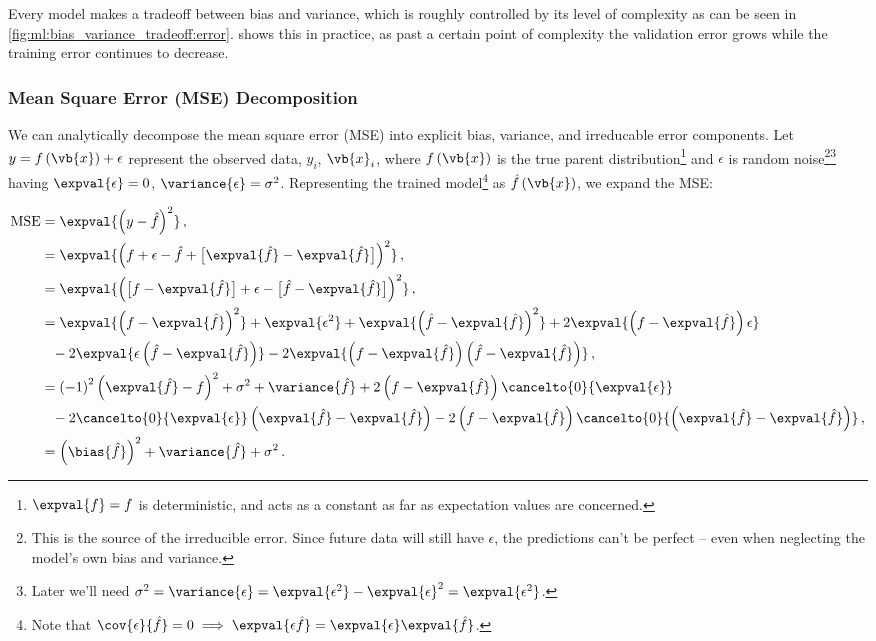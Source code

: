 Every model makes a tradeoff between bias and variance,
which is roughly controlled by its level of complexity
as can be seen in \cref{fig:ml:bias_variance_tradeoff:error}.
 shows this in practice,
as past a certain point of complexity the validation error grows
while the training error continues to decrease.

\subsubsection{Mean Square Error (MSE) Decomposition}
\label{ml_general:bias_variance_tradeoff:decop}

We can analytically decompose the mean square error (MSE) into explicit
bias, variance, and irreducable error components.
Let $y = f\left(\vb{x}\right) + \epsilon$ represent
the observed data, $y_{i}$, $\vb{x}_{i}$,
where $f\left(\vb{x}\right)$ is the true parent distribution\footnote{$\expval{f} = f$ is deterministic,
and acts as a constant as far as expectation values are concerned.} and
$\epsilon$ is random noise\footnote{This is the source of the irreducible error.
Since future data will still have $\epsilon$, the predictions can't be perfect
-- even when neglecting the model's own bias and variance.}\footnote{Later we'll need
$\sigma^{2} = \variance{\epsilon} = \expval{\epsilon^{2}} - \expval{\epsilon}^{2} = \expval{\epsilon^{2}}$.} having
$\expval{\epsilon} = 0$, $\variance{\epsilon} = \sigma^{2}$.
Representing the trained model\footnote{Note
that $\cov{\epsilon}{\hat{f}} = 0 \implies \expval{\epsilon \hat{f}} = \expval{\epsilon} \expval{\hat{f}}$.} as
$\hat{f}\left(\vb{x}\right)$, we expand the MSE:

\begin{subequations} \label{eq:bias_variance_tradeoff:decop}
\begin{align}
\text{MSE} &= \expval{\left(y-\hat{f}\right)^{2}}\,, \\
&= \expval{\left(f + \epsilon - \hat{f} + \big[\expval{\hat{f}}-\expval{\hat{f}}\big]\right)^{2}}\,, \\
&= \expval{\left(\big[f - \expval{\hat{f}}\big] + \epsilon - \big[\hat{f} - \expval{\hat{f}}\big]\right)^{2}}\,, \\
&= \expval{\left(f-\expval{\hat{f}}\right)^{2}}
+\expval{\epsilon^{2}}
+\expval{\left(\hat{f}-\expval{\hat{f}}\right)^{2}}
+2\expval{\left(f-\expval{\hat{f}}\right)\epsilon} \\
&\hphantom{=}-2\expval{\epsilon\left(\hat{f}-\expval{\hat{f}}\right)}
-2\expval{\left(f-\expval{\hat{f}}\right)\left(\hat{f}-\expval{\hat{f}}\right)}\,, \\
&= \left(-1\right)^{2}\left(\expval{\hat{f}}-f\right)^{2} +\sigma^{2} + \variance{\hat{f}}
+2\left(f-\expval{\hat{f}}\right)\cancelto{0}{\expval{\epsilon}} \\
&\hphantom{=}-2\cancelto{0}{\expval{\epsilon}}\left(\expval{\hat{f}}-\expval{\hat{f}}\right)
-2\left(f-\expval{\hat{f}}\right)\cancelto{0}{\left(\expval{\hat{f}}-\expval{\hat{f}}\right)}\,, \\
&= \left(\bias{\hat{f}}\right)^{2} + \variance{\hat{f}} + \sigma^{2}\,.
\end{align}
\end{subequations}

